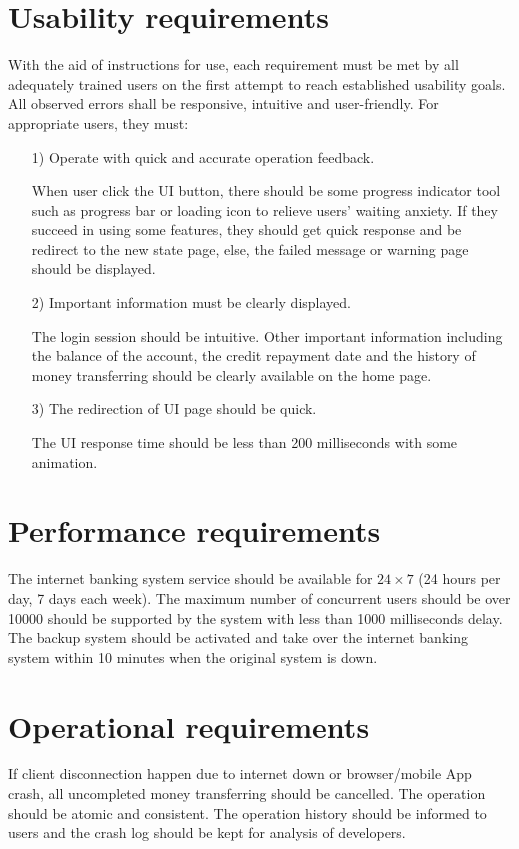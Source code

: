 \documentclass{scrreprt}
\begin{document}
\section{Usability requirements}
With the aid of instructions for use, each requirement must be met by all adequately trained users on the first attempt to reach established usability goals. All observed errors shall be responsive, intuitive and user-friendly. For appropriate users, they must:
\begin{itemize}
    \item [1)] Operate with quick and accurate operation feedback.

          When user click the UI button, there should be some progress indicator tool such as progress bar or loading icon to relieve users' waiting anxiety. If they succeed in using some features, they should get quick response and be redirect to the new state page, else, the failed message or warning page should be displayed.

    \item [2)] Important information must be clearly displayed.

          The login session should be intuitive. Other important information including the balance of the account, the credit repayment date and the history of money transferring should be clearly available on the home page.

    \item [3)] The redirection of UI page should be quick.

          The UI response time should be less than 200 milliseconds with some animation.


\end{itemize}
\section{Performance requirements}
The internet banking system service should be available for $24\times 7$ (24 hours per day, 7 days each week). The maximum number of concurrent users should be over 10000 should be supported by the system with less than 1000 milliseconds delay. The backup system should be activated and take over the internet banking system within 10 minutes when the original system is down.

\section{Operational requirements}
If client disconnection happen due to internet down or browser/mobile App crash, all uncompleted money transferring should be cancelled. The operation should be atomic and consistent. The operation history should be informed to users and the crash log should be kept for analysis of developers.
\end{document}

